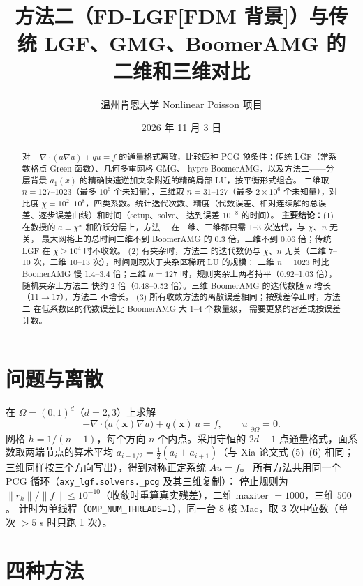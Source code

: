 \documentclass[11pt,a4paper]{ctexart}
\title{方法二（FD-LGF[FDM 背景]）与传统 LGF、GMG、BoomerAMG 的\\二维和三维对比}
\author{温州肯恩大学 \quad Nonlinear Poisson 项目}
\date{2026 年 11 月 3 日}
\newcommand{\Mtwo}{方法二}
\begin{document}
\maketitle

\begin{abstract}
对 $-\nabla\!\cdot(a\nabla u)+qu=f$ 的通量格式离散，比较四种 PCG 预条件：传统 LGF（常系数格点 Green 函数）、几何多重网格 GMG、
hypre BoomerAMG，以及\Mtwo{}——分层背景 $a_1(x)$ 的精确快速逆加夹杂附近的精确局部 LU，按平衡形式组合。
二维取 $n=127$–$1023$（最多 $10^6$ 个未知量），三维取 $n=31$–$127$（最多 $2\times10^6$ 个未知量），对比度
$\chi=10^2$–$10^8$，四类系数。统计迭代次数、精度（代数误差、相对连续解的总误差、逐步误差曲线）和时间（setup、solve、
达到误差 $10^{-8}$ 的时间）。
\textbf{主要结论：}(1) 在教授的 $a=\chi^x$ 和阶跃分层上，\Mtwo{} 在二维、三维都只需 1--3 次迭代，与 $\chi$、$n$ 无关，
最大网格上的总时间二维不到 BoomerAMG 的 0.3 倍，三维不到 0.06 倍；传统 LGF 在 $\chi\ge10^4$ 时不收敛。
(2) 有夹杂时，\Mtwo{} 的迭代数仍与 $\chi$、$n$ 无关（二维 7--10 次，三维 10--13 次），时间则取决于夹杂区稀疏 LU 的规模：
二维 $n=1023$ 时比 BoomerAMG 慢 1.4--3.4 倍；三维 $n=127$ 时，规则夹杂上两者持平（0.92--1.03 倍），
随机夹杂上\Mtwo{} 快约 2 倍（0.48--0.52 倍）。三维 BoomerAMG 的迭代数随 $n$ 增长（11$\to$17），\Mtwo{} 不增长。
(3) 所有收敛方法的离散误差相同；按残差停止时，\Mtwo{} 在低系数区的代数误差比 BoomerAMG 大 1--4 个数量级，
需要更紧的容差或按误差计数。
\end{abstract}

\tableofcontents

\section{问题与离散}
在 $\Omega=(0,1)^d$（$d=2,3$）上求解
\[
  -\nabla\cdot\big(a(\mathbf x)\nabla u\big)+q(\mathbf x)\,u=f,\qquad u|_{\partial\Omega}=0 .
\]
网格 $h=1/(n+1)$，每个方向 $n$ 个内点。采用守恒的 $2d+1$ 点通量格式，面系数取两端节点的算术平均
$a_{i+1/2}=\tfrac12(a_i+a_{i+1})$（与 Xia 论文式 (5)--(6) 相同；三维同样按三个方向写出），得到对称正定系统 $Au=f$。
所有方法共用同一个 PCG 循环（\texttt{axy\_lgf.solvers.\_pcg} 及其三维复制）：
停止规则为 $\|r_k\|/\|f\|\le10^{-10}$（收敛时重算真实残差），二维 maxiter $=1000$，三维 $500$。
计时为单线程（\texttt{OMP\_NUM\_THREADS=1}），同一台 8 核 Mac，取 3 次中位数（单次 $>5$ s 时只跑 1 次）。

\section{四种方法}
\end{document}
